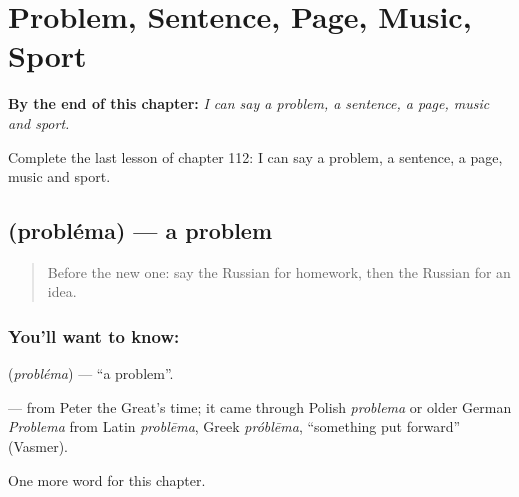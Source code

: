
\chapter{Problem, Sentence, Page, Music, Sport}
\label{ch:ru-problem-sentence-page-music-sport}

\begin{chapteropening}
\textbf{By the end of this chapter:} \emph{I can say a problem, a sentence, a page, music and sport.}

Complete the last lesson of chapter 112: I can say a problem, a sentence, a page, music and sport.
\end{chapteropening}

\section[\texorpdfstring{\ru{проблема} (probléma)}{проблема (probléma)}]{ (probléma) — a problem}

\label{lesson:RU-C112-problem}



\begin{quote}
Before the new one: say the Russian for homework, then the Russian for an idea.
\end{quote}

\subsection*{You'll want to know: }
\textbf{} (\emph{probléma}) — \textquotedblleft{}a problem\textquotedblright{}.

\begin{cousinweb}
\textbf{} — from Peter the Great's time; it came through Polish \emph{problema} or older German \emph{Problema} from Latin \emph{problēma}, Greek \emph{próblēma}, \textquotedblleft{}something put forward\textquotedblright{} (Vasmer).
\end{cousinweb}

\begin{grammarlens}[title={What you've built}]
One more word for this chapter.
\end{grammarlens}

